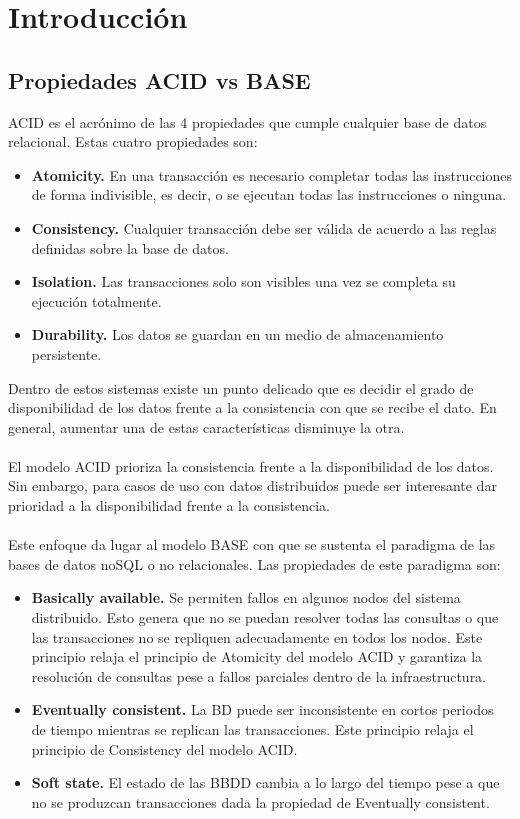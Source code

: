 \section{Introducción}
\subsection{Propiedades ACID vs BASE}
ACID es el acrónimo de las 4 propiedades que cumple cualquier base de datos relacional. Estas cuatro propiedades son:
\begin{itemize}
	\item \textbf{Atomicity.} En una transacción es necesario completar todas las instrucciones de forma indivisible, es decir, o se ejecutan todas las instrucciones o ninguna.
	\item \textbf{Consistency.} Cualquier transacción debe ser válida de acuerdo a las reglas definidas sobre la base de datos.
	\item \textbf{Isolation.} Las transacciones solo son visibles una vez se completa su ejecución totalmente.
	\item \textbf{Durability.} Los datos se guardan en un medio de almacenamiento persistente. 
\end{itemize}
Dentro de estos sistemas existe un punto delicado que es decidir el grado de disponibilidad de los datos frente a la consistencia con que se recibe el dato. En general, aumentar una de estas características disminuye la otra.\\\\
El modelo ACID prioriza la consistencia frente a la disponibilidad de los datos. Sin embargo, para casos de uso con datos distribuidos puede ser interesante dar prioridad a la disponibilidad frente a la consistencia.\\\\
Este enfoque da lugar al modelo BASE con que se sustenta el paradigma de las bases de datos noSQL o no relacionales. Las propiedades de este paradigma son:
\begin{itemize}
	\item \textbf{Basically available.} Se permiten fallos en algunos nodos del sistema distribuido. Esto genera que no se puedan resolver todas las consultas o que las transacciones no se repliquen adecuadamente en todos los nodos. Este principio relaja el principio de Atomicity del modelo ACID y garantiza la resolución de consultas pese a fallos parciales dentro de la infraestructura.
	\item \textbf{Eventually consistent.} La BD puede ser inconsistente en cortos periodos de tiempo mientras se replican las transacciones. Este principio relaja el principio de Consistency del modelo ACID.
	\item \textbf{Soft state.} El estado de las BBDD cambia a lo largo del tiempo pese a que no se produzcan transacciones dada la propiedad de Eventually consistent.
\end{itemize}
